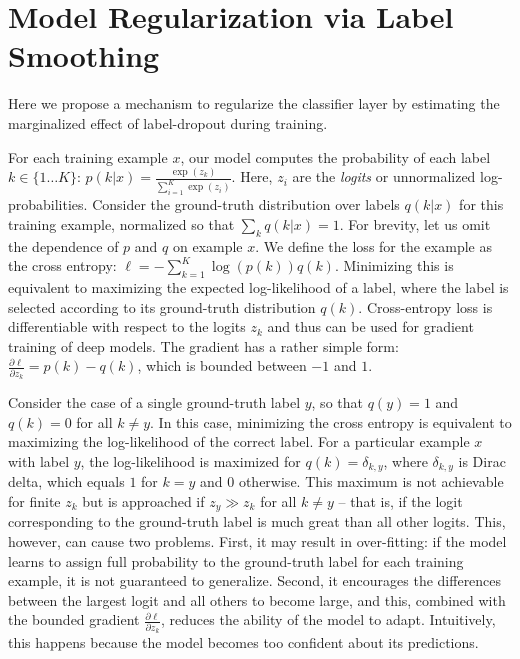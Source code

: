 \section{Model Regularization via Label Smoothing}
\label{smoothing}
Here we propose a mechanism to regularize the classifier layer by
estimating the marginalized effect of label-dropout during training.

For each training example $x$, our model computes the probability of each label
$k\in\{1\ldots K\}$: $p(k|x) = \frac{\exp(z_k)}{\sum_{i=1}^K \exp(z_i)}$. Here,
$z_i$ are the {\em logits} or unnormalized log-probabilities. Consider the
ground-truth distribution over labels $q(k|x)$ for this training example,
normalized so that $\sum_k q(k|x) = 1$. For brevity, let us omit the dependence
of $p$ and $q$ on example $x$. We define the loss for the example as the
cross entropy: $\ell = -\sum_{k=1}^K \log(p(k)) q(k)$. Minimizing this is
equivalent to maximizing the expected log-likelihood of a label, where the label
is selected according to its ground-truth distribution $q(k)$. Cross-entropy
loss is differentiable with respect to the logits $z_k$ and thus can be used for
gradient training of deep models. The gradient has a rather simple form:
$\frac{\partial\ell}{\partial z_k} = p(k) - q(k)$, which is bounded between $-1$
and $1$.

Consider the case of a single ground-truth label $y$, so that $q(y)=1$ and
$q(k)=0$ for all $k\neq y$. In this case, minimizing the cross entropy is
equivalent to maximizing the log-likelihood of the correct label. For a
particular example $x$ with label $y$, the log-likelihood is maximized for $q(k)
= \delta_{k,y}$, where $\delta_{k,y}$ is Dirac delta, which equals $1$ for $k=y$
and $0$ otherwise. This maximum is not achievable for finite $z_k$ but is
approached if $z_y\gg z_k$ for all $k\neq y$ -- that is, if the logit
corresponding to the ground-truth label is much great than all other
logits. This, however, can cause two problems. First, it may result in
over-fitting: if the model learns to assign full probability to the ground-truth
label for each training example, it is not guaranteed to generalize. Second, it
encourages the differences between the largest logit and all others to become
large, and this, combined with the bounded gradient
$\frac{\partial\ell}{\partial z_k}$, reduces the ability of the model to
adapt. Intuitively, this happens because the model becomes too confident about
its predictions.

